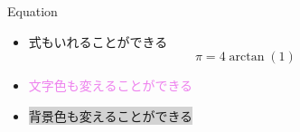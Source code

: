 \documentclass[platex,a4paper,12pt,dvipdfmx,aspectratio=169]{beamer}
\begin{document}
\begin{frame}{Equation}
\begin{itemize}
\item  式もいれることができる
\begin{equation} \pi = 4\arctan(1) \end{equation}
\item \textcolor{violet}{文字色も変えることができる}
\item \colorbox{lightgray}{背景色も変えることができる}
\end{itemize}

\end{frame}
\end{document}
